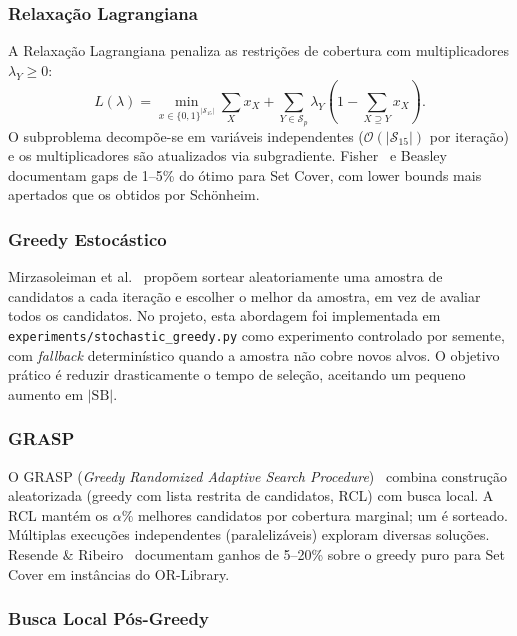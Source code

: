\documentclass[12pt,a4paper]{article}
\theoremstyle{definition}
\newcommand{\bigo}[1]{\mathcal{O}\!\left(#1\right)}
\newcommand{\SB}{\mathrm{SB}}
\begin{document}
\subsubsection{Relaxação Lagrangiana}

A Relaxação Lagrangiana penaliza as restrições de cobertura com multiplicadores
$\lambda_Y \geq 0$:
\[
L(\lambda) = \min_{x \in \{0,1\}^{|\mathcal{S}_{15}|}} \sum_X x_X
           + \sum_{Y \in \mathcal{S}_p} \lambda_Y
             \!\left(1 - \sum_{X \supseteq Y} x_X\right).
\]
O subproblema decompõe-se em variáveis independentes ($\bigo{|\mathcal{S}_{15}|}$
por iteração) e os multiplicadores são atualizados via subgradiente. Fisher~\cite{fisher1981}
e Beasley~\cite{beasley1990} documentam gaps de 1--5\% do ótimo para Set Cover,
com lower bounds mais apertados que os obtidos por Schönheim.

\subsubsection{Greedy Estocástico}

Mirzasoleiman et al.~\cite{mirzasoleiman2015} propõem sortear aleatoriamente
uma amostra de candidatos a cada iteração e escolher o melhor da amostra, em vez
de avaliar todos os candidatos. No projeto, esta abordagem foi implementada em
\texttt{experiments/stochastic\_greedy.py} como experimento controlado por
semente, com \emph{fallback} determinístico quando a amostra não cobre novos
alvos. O objetivo prático é reduzir drasticamente o tempo de seleção, aceitando
um pequeno aumento em $|\SB|$.

\subsubsection{GRASP}

O GRASP (\emph{Greedy Randomized Adaptive Search Procedure})~\cite{feo1995}
combina construção aleatorizada (greedy com lista restrita de candidatos, RCL)
com busca local. A RCL mantém os $\alpha\%$ melhores candidatos por cobertura
marginal; um é sorteado. Múltiplas execuções independentes (paralelizáveis)
exploram diversas soluções. Resende \& Ribeiro~\cite{resende2016} documentam
ganhos de 5--20\% sobre o greedy puro para Set Cover em instâncias do OR-Library.

\subsubsection{Busca Local Pós-Greedy}
\end{document}

